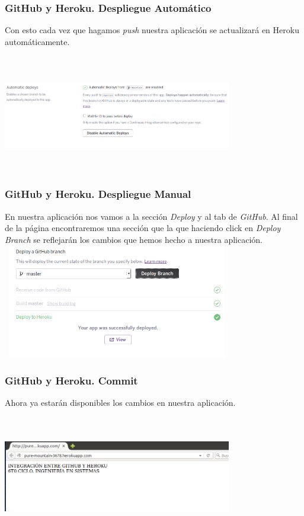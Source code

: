 \documentclass{beamer}
\begin{document}
\begin{frame}
\frametitle{GitHub y Heroku. Despliegue Automático}
Con esto cada vez que hagamos \textit{push} nuestra aplicación se actualizará en Heroku automáticamente. \\ \ \\
\includegraphics[width=10cm, height=5cm]{githubHeroku/34.png}
\end{frame}

\begin{frame}
\frametitle{GitHub y Heroku. Despliegue Manual}
En nuestra aplicación nos vamos a la sección \textit{Deploy} y al tab de \textit{GitHub}. Al final de la página encontraremos una sección que la que haciendo click en \textit{Deploy Branch} se reflejarán los cambios que hemos hecho a nuestra aplicación.\\
\centering
\includegraphics[width=10cm, height=5cm]{githubHeroku/30.png}
\end{frame}

\begin{frame}
\frametitle{GitHub y Heroku. Commit}
Ahora ya estarán disponibles los cambios en nuestra aplicación.\\ \ \\
\centering
\includegraphics[width=10cm, height=5cm]{githubHeroku/31.png}
\end{frame}
\end{document}
